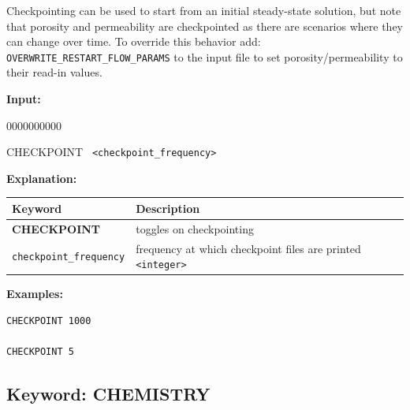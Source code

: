 Checkpointing can be used to start from an initial steady-state solution, but note that porosity and permeability are checkpointed as there are scenarios where they can change over time. To override this behavior add: {\tt OVERWRITE\_RESTART\_FLOW\_PARAMS} to the input file to set porosity/permeability to their read-in values.

{\noindent\bf Input:}

\begin{deflist}{0000000000}
\item [CHECKPOINT] \ {\tt <checkpoint\_frequency>}
\end{deflist}

{\noindent\bf Explanation:}

\begin{center}
\begin{tabularx}{\linewidth}{lX}
\toprule[1.5pt]
\bf Keyword & \bf Description\\
\midrule
\bf CHECKPOINT & toggles on checkpointing \\
{\tt checkpoint\_frequency} & frequency at which checkpoint files are printed {\tt<integer>} \\
\bottomrule
\end{tabularx}
\end{center}

\bigskip

\begin{mdframed}

{\noindent\bf Examples:}
\footnotesize

\begin{verbatim}
CHECKPOINT 1000

CHECKPOINT 5
\end{verbatim}
\normalsize
\end{mdframed}

\hyperlink{target_key}{\return}

\newpage
\protect\hypertarget{target_chem}{}

\subsection{Keyword: CHEMISTRY}

\hfill\hyperlink{target_key}{\return}

